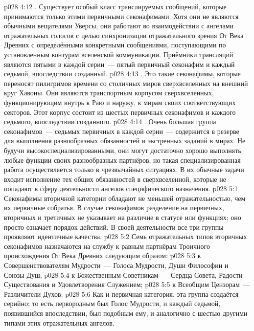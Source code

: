 \vs p028 4:12 . Существует особый класс транслируемых сообщений, которые принимаются только этими первичными секонафимами. Хотя они не являются обычными вещателями Уверсы, они работают во взаимодействии с ангелами отражательных голосов с целью синхронизации отражательного зрения От Века Древних с определёнными конкретными сообщениями, поступающими по установленным контурам вселенской коммуникации. Приёмники трансляций являются пятыми в каждой серии~--- пятый первичный секонафим и каждый седьмой, впоследствии созданный.
\vs p028 4:13 . Это такие секонафимы, которые переносят пилигримов времени со столичных миров сверхвселенных на внешний круг Хавоны. Они являются транспортным корпусом сверхвселенных, функционирующим внутрь к Раю и наружу, к мирам своих соответствующих секторов. Этот корпус состоит из шестых первичных секонафимов и каждого седьмого, впоследствии созданного.
\vs p028 4:14 . Очень большая группа секонафимов~--- седьмых первичных в каждой серии~--- содержится в резерве для выполнения разнообразных обязанностей и экстренных заданий в мирах. Не будучи высокоспециализированными, они могут достаточно хорошо выполнять любые функции своих разнообразных партнёров, но такая специализированная работа осуществляется только в чрезвычайных ситуациях. В их обычные задачи входит исполнение тех общих обязанностей в сверхвселенной, которые не попадают в сферу деятельности ангелов специфического назначения.
\vs p028 5:1 Секонафимы вторичной категории обладают не меньшей отражательностью, чем их первичные собратья. В случае секонафимов разделение на первичных, вторичных и третичных не указывает на различие в статусе или функциях; оно просто означает порядок действий. В своей деятельности все три группы проявляют идентичные качества.
\vs p028 5:2 \pc Семь отражательных типов вторичных секонафимов назначаются на службу к равным партнёрам Троичного происхождения От Века Древних следующим образом:
\vs p028 5:3 к Совершенствователям Мудрости~--- Голоса Мудрости, Души Философии и Союзы Душ;
\vs p028 5:4 к Божественным Советникам~--- Сердца Совета, Радости Существования и Удовлетворения Служением;
\vs p028 5:5 к Всеобщим Цензорам~--- Различители Духов.
\vs p028 5:6 \pc Как и первичная категория, эта группа создаётся серийно; то есть первородным был Голос Мудрости, и каждый седьмой, появившийся впоследствии, был подобным ему, и аналогично с шестью другими типами этих отражательных ангелов.
